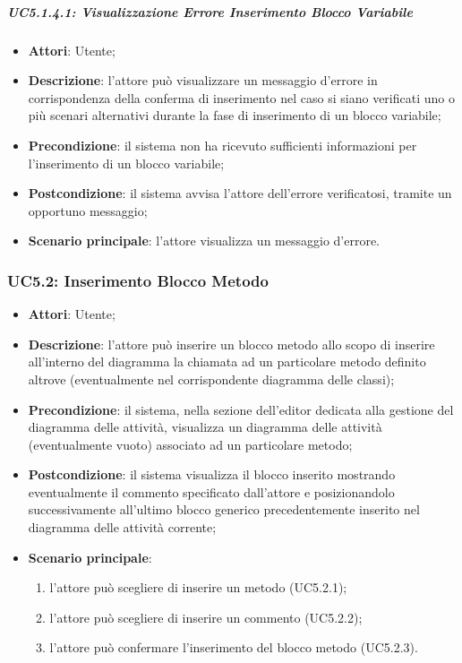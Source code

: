 \begin{itemize}
\begin{itemize}
\begin{itemize}
\begin{itemize}
\subparagraph{UC5.1.4.1: Visualizzazione Errore Inserimento Blocco Variabile}
\label{UC5.1.4.1}
\begin{itemize}
	\item \textbf{Attori}: Utente;
	\item \textbf{Descrizione}: l'attore può visualizzare un messaggio d'errore in corrispondenza della conferma di inserimento nel caso si siano verificati uno o più scenari alternativi durante la fase di inserimento di un blocco variabile;
	\item \textbf{Precondizione}: il sistema non ha ricevuto sufficienti informazioni per l'inserimento di un blocco variabile;
	\item \textbf{Postcondizione}: il sistema avvisa l'attore dell'errore verificatosi, tramite un opportuno messaggio;
	\item \textbf{Scenario principale}: l'attore visualizza un messaggio d'errore.
\end{itemize}

\subsubsection{UC5.2: Inserimento Blocco Metodo}
\label{UC5.2}
\begin{itemize}
	\item \textbf{Attori}: Utente;
	\item \textbf{Descrizione}: l'attore può inserire un blocco metodo allo scopo di inserire all'interno del diagramma la chiamata ad un particolare metodo definito altrove (eventualmente nel corrispondente diagramma delle classi);
	\item \textbf{Precondizione}: il sistema, nella sezione dell'editor dedicata alla gestione del diagramma delle attività, visualizza un diagramma delle attività (eventualmente vuoto) associato ad un particolare metodo;
	\item \textbf{Postcondizione}: il sistema visualizza il blocco inserito mostrando eventualmente il commento specificato dall'attore e posizionandolo successivamente all'ultimo blocco generico precedentemente inserito nel diagramma delle attività corrente;
	\item \textbf{Scenario principale}:
	\begin{enumerate}
		\item l'attore può scegliere di inserire un metodo (UC5.2.1);
		\item l'attore può scegliere di inserire un commento (UC5.2.2);
		\item l'attore può confermare l'inserimento del blocco metodo (UC5.2.3).
	\end{enumerate}
\end{itemize}


\end{itemize}
\end{itemize}
\end{itemize}
\end{itemize}
